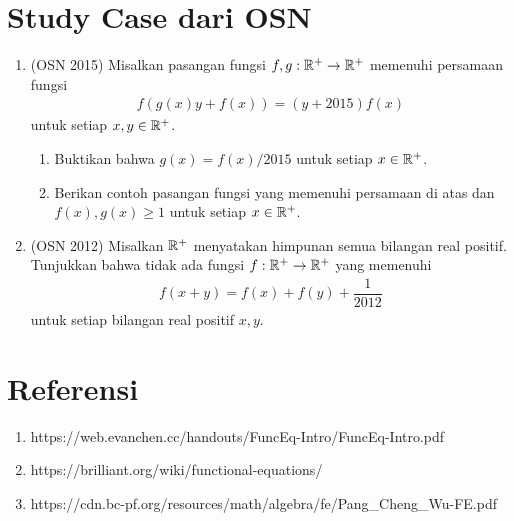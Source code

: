 \documentclass[11pt]{scrartcl}
\begin{document}
\section{Study Case dari OSN}
\begin{enumerate}
    \item (OSN 2015) Misalkan pasangan fungsi $f,g:\mathbb R^+ \to \mathbb R^+$ memenuhi persamaan fungsi
    \begin{align*}
        f(g(x)y+f(x))=(y+2015)f(x)
    \end{align*}
    untuk setiap $x,y \in \mathbb R^+$.
    \begin{enumerate}
        \item Buktikan bahwa $g(x)=f(x)/2015$ untuk setiap $x \in \mathbb R^+$.
        \item Berikan contoh pasangan fungsi yang memenuhi persamaan di atas dan $f(x),g(x) \ge 1$ untuk setiap $x \in \mathbb R^+$.
    \end{enumerate}

    \item (OSN 2012) Misalkan $\mathbb R^+$ menyatakan himpunan semua bilangan real positif. Tunjukkan bahwa tidak ada fungsi $f:\mathbb R^+ \to \mathbb R^+$ yang memenuhi
    \begin{align*}
        f(x+y)=f(x)+f(y)+\dfrac{1}{2012}
    \end{align*}
    untuk setiap bilangan real positif $x,y$.
\end{enumerate}

\section{Referensi}
\begin{enumerate}
    \item https://web.evanchen.cc/handouts/FuncEq-Intro/FuncEq-Intro.pdf
\item https://brilliant.org/wiki/functional-equations/
\item https://cdn.bc-pf.org/resources/math/algebra/fe/Pang\_Cheng\_Wu-FE.pdf
\end{enumerate}
\end{document}

